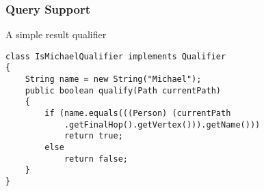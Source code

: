 \begin{frame}[fragile]
\frametitle{Query Support}
A simple result qualifier 
\begin{lstlisting}[caption=(Result qualifier)]
class IsMichaelQualifier implements Qualifier
{
    String name = new String("Michael");
    public boolean qualify(Path currentPath)
    {
        if (name.equals(((Person) (currentPath
            .getFinalHop().getVertex())).getName()))
            return true;
        else
            return false;
    }
}
\end{lstlisting}
\end{frame} 
